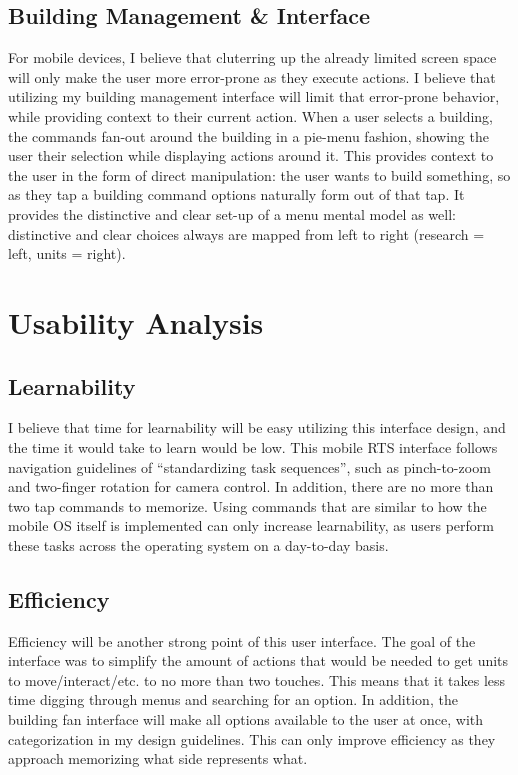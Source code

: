 \documentclass[11pt]{article}
\begin{document}
	\subsection{Building Management \& Interface}
	For mobile devices, I believe that cluterring up the already limited screen space will only make the user more error-prone as they execute actions. I believe that utilizing my building management interface will limit that error-prone behavior, while providing context to their current action. When a user selects a building, the commands fan-out around the building in a pie-menu fashion, showing the user their selection while displaying actions around it. This provides context to the user in the form of direct manipulation: the user wants to build something, so as they tap a building command options naturally form out of that tap. It provides the distinctive and clear set-up of a menu mental model as well: distinctive and clear choices always are mapped from left to right (research = left, units = right). 
\section{Usability Analysis}
	\subsection{Learnability}
	I believe that time for learnability will be easy utilizing this interface design, and the time it would take to learn would be low. This mobile RTS interface follows navigation guidelines of ``standardizing task sequences'', such as pinch-to-zoom and two-finger rotation for camera control. In addition, there are no more than two tap commands to memorize. Using commands that are similar to how the mobile OS itself is implemented can only increase learnability, as users perform these tasks across the operating system on a day-to-day basis.
	\subsection{Efficiency}
	Efficiency will be another strong point of this user interface. The goal of the interface was to simplify the amount of actions that would be needed to get units to move/interact/etc. to no more than two touches. This means that it takes less time digging through menus and searching for an option. In addition, the building fan interface will make all options available to the user at once, with categorization in my design guidelines. This can only improve efficiency as they approach memorizing what side represents what.
\end{document}
